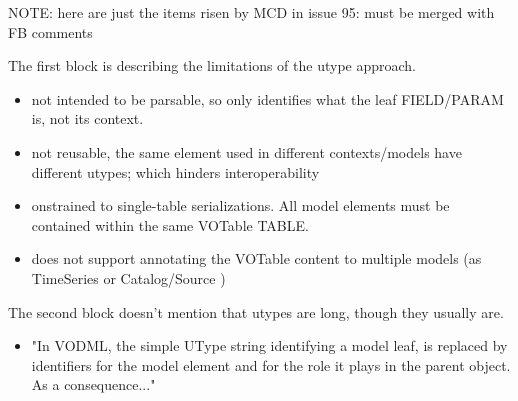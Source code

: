 NOTE: here are just the items risen by MCD in issue 95: must be merged with FB comments

The first block is describing the limitations of the utype approach.
\begin{itemize}
  \item not intended to be parsable, so only identifies what the leaf 
  FIELD/PARAM is, not its context.
  \item not reusable, the same element used in different contexts/models 
  have different utypes; which hinders interoperability
  \item onstrained to single-table serializations. All model elements must 
  be contained within the same VOTable TABLE.
  \item does not support annotating the VOTable content to multiple models 
  (as TimeSeries or Catalog/Source )
\end{itemize}

The second block doesn't mention that utypes are long, though they usually are.
\begin{itemize}
  \item "In VODML, the simple UType string identifying a model leaf, is replaced 
  by identifiers for the model element and for the role it plays in the parent
  object. As a consequence..."
\end{itemize}

